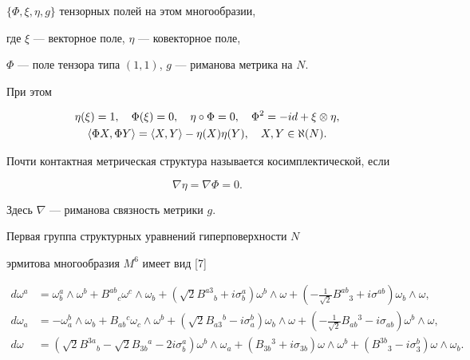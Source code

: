$\{\Phi,\xi,\eta, g \}$ тензорных полей на этом многообразии, 


где $\xi$ --- векторное поле, $\eta$ --- ковекторное поле, 


$\Phi$ --- поле тензора типа $(1,1)$, $g$ --- риманова метрика на $N$.


При этом


\begin{gather*}


\eta(\xi)=1, \quad \Phi(\xi)=0, \quad \eta \circ


\Phi=0, \quad \Phi^2=-i d+ \xi \otimes \eta, \\


\la \Phi X,\Phi Y\ra  = \la X,Y\ra  - \eta(X)\eta(Y), 


\quad X,Y \in \aleph(N).


\end{gather*}





Почти контактная метрическая структура называется косимплектической, если


$$


\nabla\eta=\nabla\Phi=0.


$$


Здесь $\nabla$ --- риманова связность метрики $g$.


Первая группа структурных уравнений гиперповерхности $N$ 


эрмитова многообразия $M^6$ имеет вид [7]


\begin{align*}


d\omega^a&=\omega^a_b \wedge \omega^b + 


B^{ab}{_c} \omega^c \wedge \omega _b+


(\sqrt{2} B^{a3}{_b} + i \sigma^a_b) \omega^b \wedge \omega + 


(-\tfrac {1}{\sqrt{2}} 


B^{ab}{_3} + i \sigma^{ab})\omega _b \wedge \omega ,\\


%


d\omega_a&=-\omega^b_a \wedge \omega_b + 


B_{ab}{^c}\omega_c \wedge \omega^b + 


(\sqrt{2}B_{a3}{^b} - i \sigma_a^b)\omega_b \wedge \omega+ 


(-\tfrac {1}{\sqrt{2}}B_{ab}{^3} - i \sigma_{ab})


\omega^b \wedge \omega,\\


%


d\omega&=(\sqrt{2} B^{3a}{_b} - \sqrt{2} B_{3b}{^a} - 2 i \sigma^a_b)


\omega^b \wedge \omega_a+(B_{3b}{^3} + i \sigma_{3b})


\omega \wedge \omega^b + 


(B^{3b}{_3} - i \sigma^b_3) \omega \wedge \omega_b.


\end{align*}



